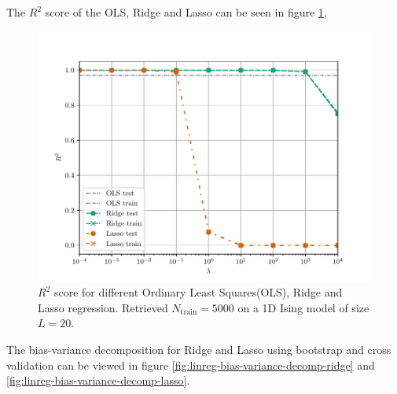 The $R^2$ score of the OLS, Ridge and Lasso can be seen in figure \ref{fig:linreg-r2},
\begin{figure}[H]
    \centering
    \includegraphics[scale=1.0]{../fig/r2_ols_ridge_lasso.pdf}
    \caption{$R^2$ score for different Ordinary Least Squares(OLS), Ridge and Lasso regression. Retrieved $N_\mathrm{train}=5000$ on a 1D Ising model of size $L=20$.}
    \label{fig:linreg-r2}
\end{figure}

The bias-variance decomposition for Ridge and Lasso using bootstrap and cross validation can be viewed in figure \ref{fig:linreg-bias-variance-decomp-ridge} and \ref{fig:linreg-bias-variance-decomp-lasso}.

